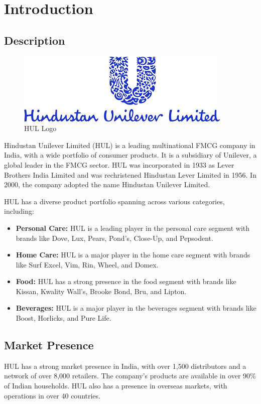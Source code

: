 \setcounter{page}{1}
\newpage
\section{Introduction}

\subsection{Description}
\begin{figure}
    \centering
    \includegraphics[width=0.9\linewidth]{images/HUL logo.png}
    \caption{HUL Logo}
    \label{fig:hul_logo}
\end{figure}
Hindustan Unilever Limited (HUL) is a leading multinational FMCG company in India, with a wide portfolio of consumer products. It is a subsidiary of Unilever, a global leader in the FMCG sector. HUL was incorporated in 1933 as Lever Brothers India Limited and was rechristened Hindustan Lever Limited in 1956. In 2000, the company adopted the name Hindustan Unilever Limited.

HUL has a diverse product portfolio spanning across various categories, including:

\begin{itemize}
    \item \textbf{Personal Care:} HUL is a leading player in the personal care segment with brands like Dove, Lux, Pears, Pond's, Close-Up, and Pepsodent.
    \item \textbf{Home Care:} HUL is a major player in the home care segment with brands like Surf Excel, Vim, Rin, Wheel, and Domex.
    \item \textbf{Food:} HUL has a strong presence in the food segment with brands like Kissan, Kwality Wall's, Brooke Bond, Bru, and Lipton.
    \item \textbf{Beverages:} HUL is a major player in the beverages segment with brands like Boost, Horlicks, and Pure Life.
\end{itemize}

\subsection{Market Presence}
HUL has a strong market presence in India, with over 1,500 distributors and a network of over 8,000 retailers. The company's products are available in over 90\% of Indian households. HUL also has a presence in overseas markets, with operations in over 40 countries.

